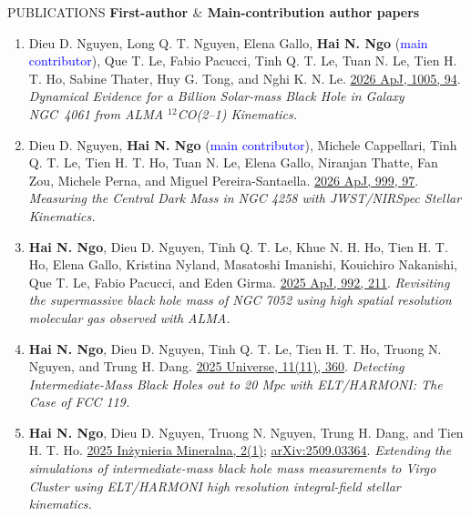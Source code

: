 \documentclass{resume} %
\begin{document}
\begin{rSection}{PUBLICATIONS}
\textbf{First-author $\&$ Main-contribution author papers}
\begin{enumerate}
\item {Dieu D. Nguyen}, Long Q. T. Nguyen, Elena Gallo, \textbf{Hai N. Ngo} (\textcolor{blue}{{main contributor}}), Que T. Le, Fabio Pacucci, Tinh Q. T. Le, Tuan N. Le, Tien H. T. Ho, Sabine Thater, Huy G. Tong, and Nghi K. N. Le. \textcolor{blue}{\href{https://doi.org/10.3847/1538-4357/ae771c}{2026 ApJ, 1005, 94}}. \textit{Dynamical Evidence for a Billion Solar-mass Black Hole in Galaxy NGC~4061 from ALMA $^{12}$CO(2--1) Kinematics.}

\item {Dieu D. Nguyen}, \textbf{Hai N. Ngo} (\textcolor{blue}{{main contributor}}), Michele Cappellari, Tinh Q. T. Le, Tien H. T. Ho, Tuan N. Le, Elena Gallo, Niranjan Thatte, Fan Zou, Michele Perna, and Miguel Pereira-Santaella. \textcolor{blue}{\href{https://doi.org/10.3847/1538-4357/ae32f2}{2026 ApJ, 999, 97}}. \textit{Measuring the Central Dark Mass in NGC 4258 with JWST/NIRSpec Stellar Kinematics.}

\item \textbf{Hai N. Ngo}, {Dieu D. Nguyen}, Tinh Q. T. Le, Khue N. H. Ho, Tien H. T. Ho, Elena Gallo, Kristina Nyland, Masatoshi Imanishi, Kouichiro Nakanishi, Que T. Le, Fabio Pacucci, and Eden Girma. \textcolor{blue}{\href{https://doi.org/10.3847/1538-4357/ae0455}{2025 ApJ, 992, 211}}. \textit{Revisiting the supermassive black hole mass of NGC 7052 using high spatial resolution molecular gas observed with ALMA.}

\item \textbf{Hai N. Ngo}, {Dieu D. Nguyen}, Tinh Q. T. Le, Tien H. T. Ho, Truong N. Nguyen, and Trung H. Dang. \textcolor{blue}{\href{https://doi.org/10.3390/universe11110360}{2025 Universe, 11(11), 360}}. \textit{{Detecting Intermediate-Mass Black Holes out to 20 Mpc with ELT/HARMONI: The Case of FCC 119}.}

\item \textbf{Hai N. Ngo}, {Dieu D. Nguyen}, Truong N. Nguyen, Trung H. Dang, and Tien H. T. Ho. \textcolor{blue}{\href{https://doi.org/10.29227/IM-2025-01-02-042}{2025 In\.{z}ynieria Mineralna, 2(1)}}; \textcolor{blue}{\href{https://arxiv.org/abs/2509.03364}{arXiv:2509.03364}}. \textit{Extending the simulations of intermediate-mass black hole mass measurements to Virgo Cluster using ELT/HARMONI high resolution integral-field stellar kinematics.}


\end{enumerate}
\end{rSection}
\end{document}
